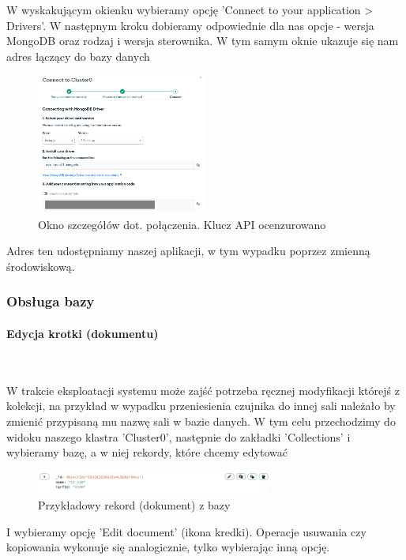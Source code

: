 W wyskakującym okienku wybieramy opcję 'Connect to your application > Drivers'. W następnym kroku 
dobieramy odpowiednie dla nas opcje - wersja MongoDB oraz rodzaj i wersja sterownika. W tym samym oknie ukazuje się nam adres łączący do bazy danych

\begin{figure}[H]
    \centering
    \includegraphics[width=0.5\textwidth]{zdj/atlas_5_cenz.png}
    \caption{Okno szczegółów dot. połączenia. Klucz API ocenzurowano}
\end{figure}

Adres ten udostępniamy naszej aplikacji, w tym wypadku poprzez zmienną środowiskową.

\subsubsection{Obsługa bazy}

\paragraph{Edycja krotki (dokumentu)} \

W trakcie eksploatacji systemu może zajść potrzeba ręcznej modyfikacji którejś z kolekcji, na przykład w wypadku przeniesienia czujnika do innej sali należało by
zmienić przypisaną mu nazwę sali w bazie danych. W tym celu przechodzimy do widoku naszego klastra 'Cluster0', następnie do zakładki 'Collections' i wybieramy 
bazę, a w niej rekordy, które chcemy edytować

\begin{figure}[H]
    \centering
    \includegraphics[width=0.7\textwidth]{zdj/atlas_6.png}
    \caption{Przykładowy rekord (dokument) z bazy}
\end{figure}

I wybieramy opcję 'Edit document' (ikona kredki). Operacje usuwania czy kopiowania wykonuje się analogicznie, tylko wybierając inną opcję.

